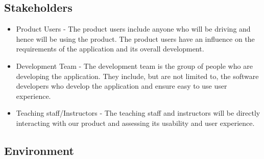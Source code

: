 \documentclass{article}
\begin{document}
\subsection{Stakeholders}
\begin{itemize}
    \item Product Users - The product users include anyone who will be driving and hence will 
    be using the product. The product users have an influence on the requirements of the application 
    and its overall development. 
    \item Development Team - The development team is the group of people who are developing the application. 
    They include, but are not limited to, the software developers who develop the application and ensure easy 
    to use user experience.
    \item Teaching staff/Instructors - The teaching staff and instructors will be directly interacting with 
    our product and assessing its usability and user experience. 
\end{itemize}

\subsection{Environment}

\end{document}
